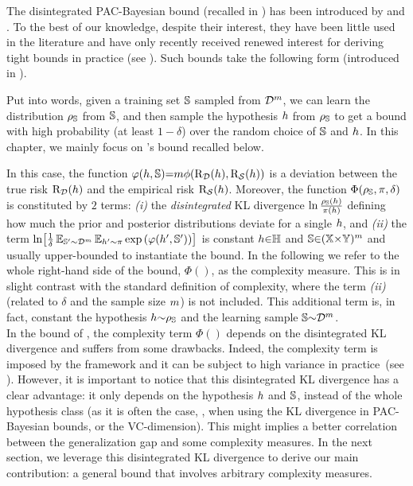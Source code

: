 The disintegrated PAC-Bayesian bound (recalled in ) has been introduced by \citet[Th~1.2.7]{Catoni2007} and \citet[Prop~3.1]{BlanchardFleuret2007}.
To the best of our knowledge, despite their interest, they have been little used in the literature and have only recently received renewed interest for deriving tight bounds in practice (see ).
Such bounds take the following form (introduced in ).


Put into words, given a training set $\S$ sampled from $\D^\m$, we can learn the distribution $\AQ$ from $\S$, and then sample the hypothesis $\h$ from $\AQ$ to get a bound with high probability (at least $1-\delta$) over the random choice of $\S$ and $\h$.
In this chapter, we mainly focus on \citet{RivasplataKuzborskijSzepesvariShaweTaylor2020}'s bound recalled below. 

\generaldisintegratedrivasplata*

In this case, the function $\varphi(\h,\S){=}\m\phi(\Risk_{\D}(\h), \Risk_{\dS}(\h))$ is a deviation between the true risk $\Risk_{\D}(\h)$ and the empirical risk $\Risk_{\dS}(\h)$.
Moreover, the function $\Phi(\AQ, \P, \delta)$ is constituted by $2$ terms: {\it (i)} the {\it disintegrated} KL divergence $\ln\tfrac{\AQ(\h)}{\P(\h)}$ defining how much the prior and posterior distributions deviate for a single $\h$, and {\it (ii)} the term $\ln\!\LB\frac{1}{\delta}\EE_{\S'\sim\D^\m}\EE_{\h'\sim\P} \exp\LP\varphi(\h',\S')\RP\RB$ is constant \wrt $\h{\in}\H$ and $\S{\in}(\X{\times}\Y)^\m$ and usually upper-bounded to instantiate the bound.
In the following we refer to the whole right-hand side of the bound, $\Phi()$, as the complexity measure.
This is in slight contrast with the standard definition of complexity, where the term {\it (ii)} (related to $\delta$ and the sample size $\m$) is not included.
This additional term is, in fact, constant \wrt the hypothesis $\h{\sim}\AQ$ and the learning sample $\S{\sim}\D^\m$.\\

In the bound of , the complexity term $\Phi()$ depends on the disintegrated KL divergence and suffers from some drawbacks.
Indeed, the complexity term is imposed by the framework and it can be subject to high variance in practice~(see ).
However, it is important to notice that this disintegrated KL divergence has a clear advantage: it only depends on the hypothesis $\h$ and $\S$, instead of the whole hypothesis class (as it is often the case, \eg, when using the KL divergence in PAC-Bayesian bounds, or the VC-dimension). 
This might implies a better correlation between the generalization gap and some complexity measures.
In the next section, we leverage this disintegrated KL divergence to derive our main contribution: a general bound that involves arbitrary complexity measures. 

